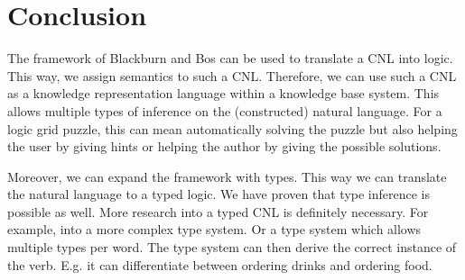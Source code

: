 \section{Conclusion}
The framework of Blackburn and Bos can be used to translate a CNL into logic. This way, we assign semantics to such a CNL. Therefore, we can use such a CNL as a knowledge representation language within a knowledge base system. This allows multiple types of inference on the (constructed) natural language. For a logic grid puzzle, this can mean automatically solving the puzzle but also helping the user by giving hints or helping the author by giving the possible solutions.

Moreover, we can expand the framework with types. This way we can translate the natural language to a typed logic. We have proven that type inference is possible as well. More research into a typed CNL is definitely necessary. For example, into a more complex type system. Or a type system which allows multiple types per word. The type system can then derive the correct instance of the verb. E.g. it can differentiate between ordering drinks and ordering food.
